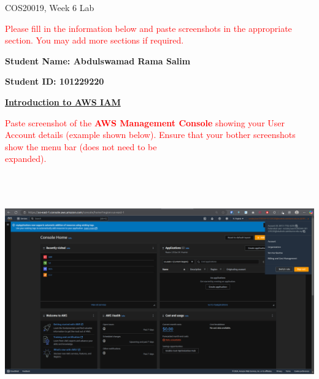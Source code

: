 \documentclass[11pt]{article}
\begin{document}
\noindent COS20019, Week 6 Lab

\vspace{0.8cm}

\noindent\textcolor{red}{Please fill in the information below and paste screenshots in the appropriate section. You may add more sections if required.}

\vspace{0.4cm}

\noindent\textbf{Student Name: Abdulswamad Rama Salim} 

\vspace{0.45cm}

\noindent\textbf{Student ID\@: 101229220}

\vspace{1.2cm}

\noindent\underline{\textbf{Introduction to AWS IAM}}

\vspace{0.6cm}

\noindent\textcolor{red}{Paste screenshot of the \textbf{AWS Management Console} showing your User Account details (example shown below). Ensure that your bother screenshots show the menu bar (does not need to be\\ expanded).}

\vspace{0.6cm}


{\centering
\includegraphics[width=6.2in, height=4.0in]{pics/0.png}}
\end{document}
